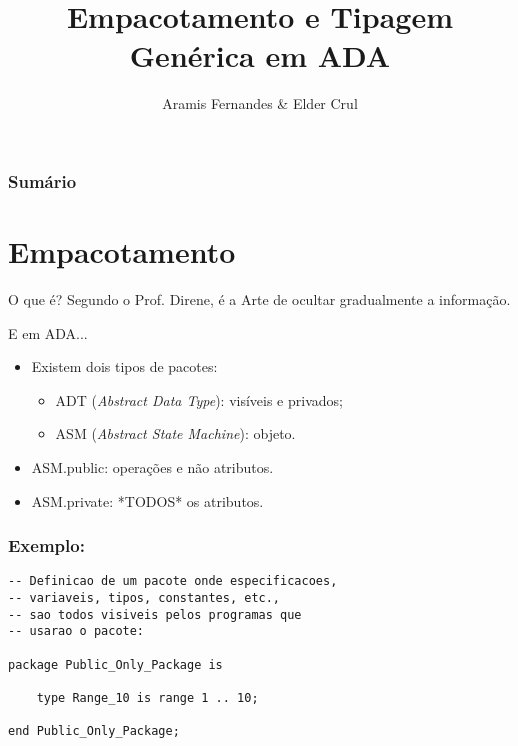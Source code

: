 \documentclass{beamer}
\title{Empacotamento e Tipagem Genérica em ADA}
\author{Aramis Fernandes \& Elder Crul}
\begin{document}
    \frame{\titlepage}

    \frame
    {
        \frametitle{Sumário}
        \tableofcontents
    }


    \section{Empacotamento}

    \begin{frame}{O que é?}
        Segundo o Prof. Direne, é a Arte de ocultar gradualmente a informação.
    \end{frame}

    \begin{frame}{E em ADA...}
        \begin{itemize}
            \item<1-> Existem dois tipos de pacotes:
            \begin{itemize}
                \item ADT (\textit{Abstract Data Type}): visíveis e privados;
                \item ASM (\textit{Abstract State Machine}): objeto.
            \end{itemize}
            \item<2-> ASM.public: operações e não atributos.
            \item<2-> ASM.private: *TODOS* os atributos.
        \end{itemize}
    \end{frame}

    \begin{frame}[containsverbatim]

        \frametitle{Exemplo:}
        \begin{verbatim}
-- Definicao de um pacote onde especificacoes,
-- variaveis, tipos, constantes, etc.,
-- sao todos visiveis pelos programas que
-- usarao o pacote:

package Public_Only_Package is

    type Range_10 is range 1 .. 10;

end Public_Only_Package;
        \end{verbatim}
    \end{frame}
\end{document}
